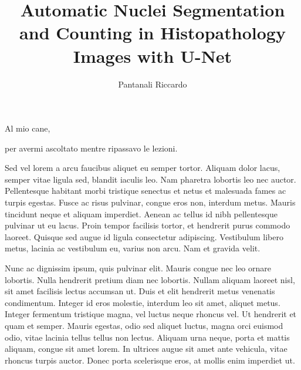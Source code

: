\documentclass[target=bach,aauheader=,style=]{thud}
\title{Automatic Nuclei Segmentation and Counting in Histopathology Images with U-Net}
\author{Pantanali Riccardo}
\begin{document}
\maketitle

\begin{dedication}
	Al mio cane,\par per avermi ascoltato mentre ripassavo le lezioni.
\end{dedication}

\acknowledgements
Sed vel lorem a arcu faucibus aliquet eu semper tortor. Aliquam dolor lacus, semper vitae ligula sed, blandit iaculis leo. Nam pharetra lobortis leo nec auctor. Pellentesque habitant morbi tristique senectus et netus et malesuada fames ac turpis egestas. Fusce ac risus pulvinar, congue eros non, interdum metus. Mauris tincidunt neque et aliquam imperdiet. Aenean ac tellus id nibh pellentesque pulvinar ut eu lacus. Proin tempor facilisis tortor, et hendrerit purus commodo laoreet. Quisque sed augue id ligula consectetur adipiscing. Vestibulum libero metus, lacinia ac vestibulum eu, varius non arcu. Nam et gravida velit.

\abstract
Nunc ac dignissim ipsum, quis pulvinar elit. Mauris congue nec leo ornare lobortis. Nulla hendrerit pretium diam nec lobortis. Nullam aliquam laoreet nisl, sit amet facilisis lectus accumsan ut. Duis et elit hendrerit metus venenatis condimentum. Integer id eros molestie, interdum leo sit amet, aliquet metus. Integer fermentum tristique magna, vel luctus neque rhoncus vel. Ut hendrerit et quam et semper. Mauris egestas, odio sed aliquet luctus, magna orci euismod odio, vitae lacinia tellus tellus non lectus. Aliquam urna neque, porta et mattis aliquam, congue sit amet lorem. In ultrices augue sit amet ante vehicula, vitae rhoncus turpis auctor. Donec porta scelerisque eros, at mollis enim imperdiet ut. 

\tableofcontents


\listoffigures

\mainmatter

\end{document}
